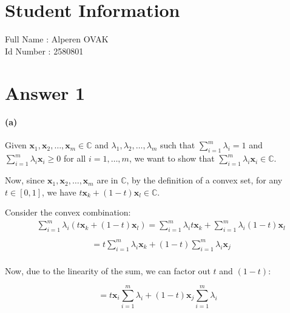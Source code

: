 \documentclass[12pt]{article}
\begin{document}
\section*{Student Information } 
Full Name :  Alperen OVAK\\
Id Number :  2580801\\

\section*{Answer 1}

\paragraph{(a)}

Given $\mathbf{x}_1, \mathbf{x}_2, \ldots, \mathbf{x}_m \in \mathbb{C}$ and $\lambda_1, \lambda_2, \ldots, \lambda_m$ such that $\sum_{i=1}^{m} \lambda_i = 1$ and $\sum_{i=1}^{m} \lambda_i \mathbf{x}_i \geq 0$ for all $i=1, \ldots, m$, we want to show that $\sum_{i=1}^{m} \lambda_i \mathbf{x}_i \in \mathbb{C}$.

Now, since $\mathbf{x}_1, \mathbf{x}_2, \ldots, \mathbf{x}_m$ are in $\mathbb{C}$, by the definition of a convex set, for any $t \in [0,1]$, we have $ t \mathbf{x}_k + (1-t)\mathbf{x}_l \in \mathbb{C}$.

Consider the convex combination:
\begin{equation}
    \begin{aligned}
    &\sum_{i=1}^{m} \lambda_i \left(t\mathbf{x}_k + (1-t)\mathbf{x}_l\right) 
    = \sum_{i=1}^{m} \lambda_i t \mathbf{x}_k + \sum_{i=1}^{m} \lambda_i (1-t) \mathbf{x}_l \\
    \end{aligned}
\end{equation}
\begin{equation}
    \begin{aligned}
    &= t \sum_{i=1}^{m} \lambda_i \mathbf{x}_k + (1-t) \sum_{i=1}^{m} \lambda_i \mathbf{x}_j \\
    \end{aligned}
\end{equation}

Now, due to the linearity of the sum, we can factor out $t$ and $(1-t)$:

\[
= t \mathbf{x}_i \sum_{i=1}^{m} \lambda_i  + (1-t) \mathbf{x}_j \sum_{i=1}^{m} \lambda_i
\]
\end{document}
